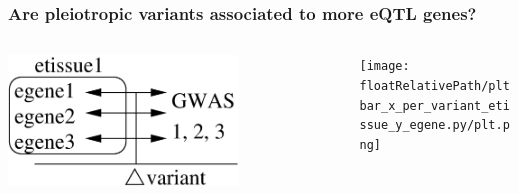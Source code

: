 \documentclass{beamer}
\newcommand*{\floatRelativePath}{../out/gwas417/pval_5e-08/r2_0.1/kb_1000/window_1000000/75_50}%
\begin{document}
    \begin{frame}
        \frametitle{Are pleiotropic variants associated to more eQTL genes?}

        \begin{columns}
            \begin{column}{0.5\textwidth}
                \begin{center}
                    \includegraphics[width=0.7\textwidth]{../presentation_230120_gold2022_paris/fig/model_pleio_egenes.png}
                \end{center}
            \end{column}
            \begin{column}{0.5\textwidth}  %
                \begin{center}
                    \texttt{[image: \\floatRelativePath/pltbar\_x\_per\_variant\_etissue\_y\_egene.py/plt.png]}
                \end{center}
            \end{column}
        \end{columns}

    \end{frame}
\end{document}
